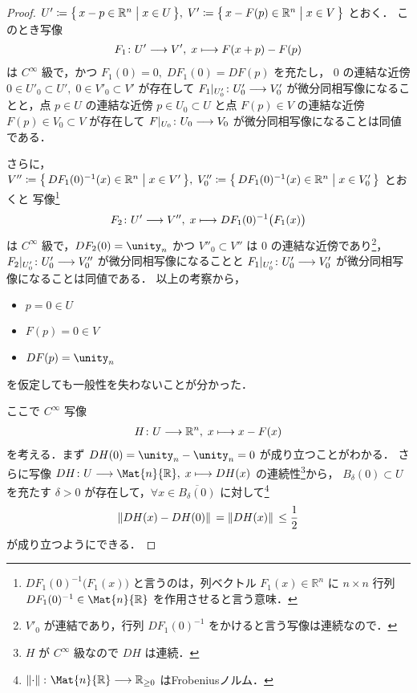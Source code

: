 \documentclass[TQFT_main]{subfiles}
\begin{document}
\begin{proof}
    $U' \coloneqq \bigl\{\, x - p \in \mathbb{R}^n \bigm| x \in U \,\bigr\},\; V' \coloneqq \bigl\{\, x - F(p) \in \mathbb{R}^n \bigm| x \in V \,\bigr\}$ とおく．
    このとき写像
    \begin{align}
        F_1 \colon U' \longrightarrow V',\; x \longmapsto F(x + p) - F(p)
    \end{align}
    は $C^\infty$ 級で，かつ $F_1(0) = 0,\; DF_1(0) = DF(p)$ を充たし，
    $0$ の連結な近傍 $0 \in U'_0 \subset U',\; 0 \in V'_0 \subset V'$ が存在して $F_1|_{U'_0} \colon U'_0 \longrightarrow V'_0$ が微分同相写像になることと，点 $p \in U$ の連結な近傍 $p \in U_0 \subset U$ と点 $F(p) \in V$ の連結な近傍 $F(p) \in V_0 \subset V$ が存在して $F|_{U_0} \colon U_0 \longrightarrow V_0$ が微分同相写像になることは同値である．

    さらに，$V'' \coloneqq \bigl\{\, DF_1(0)^{-1}(x) \in \mathbb{R}^n \bigm| x \in V' \,\bigr\},\; V''_0 \coloneqq \bigl\{\, DF_1(0)^{-1}(x) \in \mathbb{R}^n \bigm| x \in V'_0 \,\bigr\}$ とおくと
    写像\footnote{$DF_1(0)^{-1} \bigl(F_1(x)\bigr)$ と言うのは，列ベクトル $F_1(x) \in \mathbb{R}^n$ に $n \times n$ 行列 $DF_1(0)^{-1} \in \Mat{n}{\mathbb{R}}$ を作用させると言う意味．} 
    \begin{align}
        F_2 \colon U' \longrightarrow V'',\; x \longmapsto DF_1(0)^{-1} \bigl(F_1(x)\bigr)
    \end{align}
    は $C^\infty$ 級で，$DF_2(0) = \unity_n$ かつ $V''_0 \subset V''$ は $0$ の連結な近傍であり\footnote{$V'_0$ が連結であり，行列 $DF_1(0)^{-1}$ をかけると言う写像は連続なので．}，
    $F_2|_{U'_0} \colon U'_0 \longrightarrow V''_0$ が微分同相写像になることと $F_1|_{U'_0} \colon U'_0 \longrightarrow V'_0$ が微分同相写像になることは同値である．
    以上の考察から，
    \begin{itemize}
        \item $p = 0 \in U$
        \item $F(p) = 0 \in V$
        \item $DF(p) = \unity_n$
    \end{itemize}
    を仮定しても一般性を失わないことが分かった．


    ここで $C^\infty$ 写像
    \begin{align}
        H \colon U \longrightarrow \mathbb{R}^n,\; x \longmapsto x - F(x)
    \end{align}
    を考える．まず $DH(0) = \unity_n - \unity_n = 0$ が成り立つことがわかる．
    さらに写像 $DH \colon U \lto \Mat{n}{\mathbb{R}},\; x \lmto DH(x)$ の連続性\footnote{$H$ が $C^\infty$ 級なので $DH$ は連続．}から，
    $B_\delta(0) \subset U$ を充たす $\delta > 0$ が存在して，$\forall x \in \overline{B_\delta(0)}$ に対して\footnote{$\norm*{\cdot} \colon \Mat{n}{\mathbb{R}} \lto \mathbb{R}_{\ge 0}$ はFrobeniusノルム．}
    \begin{align}
        \norm*{DH(x) - DH(0)} = \norm*{DH(x)} \le \frac{1}{2}
    \end{align}
    が成り立つようにできる．


\end{proof}
\end{document}
